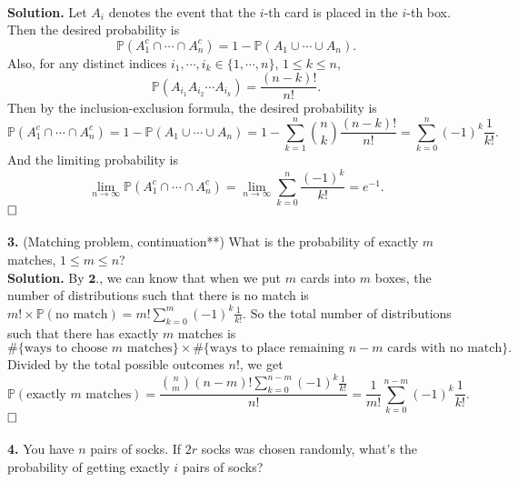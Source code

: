 \documentclass[12pt]{article}
\begin{document}
\\
\textbf{Solution.} Let $A_i$ denotes the event that the $i$-th card is placed in the $i$-th box. Then the desired probability is
\begin{equation*}
\mathbb{P}(A_1^c\cap\cdots\cap A_n^c)=1-\mathbb{P}(A_1\cup\cdots\cup A_n).
\end{equation*}
Also, for any distinct indices $i_1,\cdots,i_k\in\{1,\cdots,n\}$, $1\leq k\leq n$,
\begin{equation*}
\mathbb{P}(A_{i_1}A_{i_2}\cdots A_{i_k})=\frac{(n-k)!}{n!}.
\end{equation*}
Then by the inclusion-exclusion formula, the desired probability is
\begin{equation*}
\mathbb{P}(A_1^c\cap\cdots\cap A_n^c)=1-\mathbb{P}(A_1\cup\cdots\cup A_n)=1-\sum_{k=1}^n\binom{n}{k}\frac{(n-k)!}{n!}=\sum_{k=0}^n(-1)^k\frac{1}{k!}.
\end{equation*}
And the limiting probability is
\begin{equation*}
\lim_{n\rightarrow\infty}\mathbb{P}(A_1^c\cap\cdots\cap A_n^c)=\lim_{n\rightarrow\infty}\sum_{k=0}^n\frac{(-1)^k}{k!}=e^{-1}.
\end{equation*}
$\hspace{\fill}\square$
\\ \\
\textbf{3.} (Matching problem, continuation**) What is the probability of exactly $m$ matches, $1\leq m\leq n$?
\\
\textbf{Solution.} By $\textbf{2.}$, we can know that when we put $m$ cards into $m$ boxes, the number of distributions such that there is no match is $m!\times\mathbb{P}(\text{no match})=m!\sum_{k=0}^m(-1)^k\frac{1}{k!}$. So the total number of distributions such that there has exactly $m$ matches is
\begin{equation*}
\#\{\text{ways to choose $m$ matches}\}\times \#\{\text{ways to place remaining $n-m$ cards with no match}\}.
\end{equation*}
Divided by the total possible outcomes $n!$, we get
\begin{equation*}
\mathbb{P}(\text{exactly $m$ matches})=\frac{\binom{n}{m}(n-m)!\sum_{k=0}^{n-m}(-1)^k\frac{1}{k!}}{n!}=\frac{1}{m!}\sum_{k=0}^{n-m}(-1)^k\frac{1}{k!}.
\end{equation*}
$\hspace{\fill}\square$
\\ \\
\textbf{4.} You have $n$ pairs of socks. If $2r$ socks was chosen randomly, what’s the probability of getting exactly $i$ pairs of socks?
\end{document}
